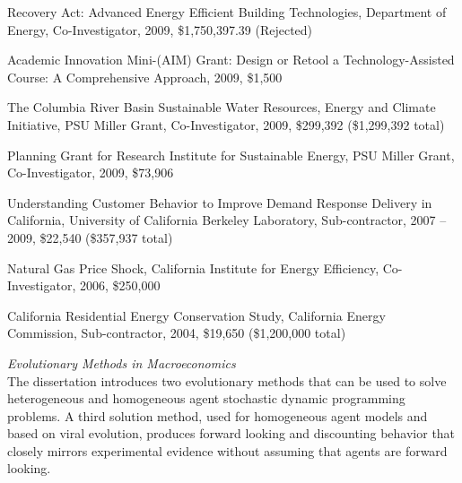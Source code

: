 \documentclass[Computer Science]{vita}
\begin{document}
\begin{vita}
\begin{Grants and Sponsored Research}
\item Recovery Act:  Advanced Energy Efficient Building Technologies, Department of Energy, Co-Investigator, 2009, \$1,750,397.39 (Rejected)
 
\item Academic Innovation Mini-(AIM) Grant: Design or Retool a Technology-Assisted Course: A Comprehensive Approach, 2009, \$1,500

\item The Columbia River Basin Sustainable Water Resources, Energy and Climate Initiative,  PSU Miller Grant, Co-Investigator, 2009, \$299,392 (\$1,299,392 total)

\item Planning Grant for Research Institute for Sustainable Energy, PSU Miller Grant,  Co-Investigator, 2009, \$73,906

  \item Understanding Customer Behavior to Improve Demand Response Delivery in California, University of California Berkeley Laboratory, Sub-contractor, 2007 -- 2009, \$22,540 (\$357,937 total)

\item Natural Gas Price Shock, California Institute for Energy
    Efficiency, Co-Investigator, 2006, \$250,000

\item California Residential Energy Conservation Study, California Energy Commission, Sub-contractor, 2004, \$19,650 (\$1,200,000 total)

  \end{Grants and Sponsored Research}

  \begin{Publications}

    \begin{Thesis}
    \item \emph{Evolutionary Methods in Macroeconomics} \\
      The dissertation introduces two evolutionary methods that can be
      used to solve heterogeneous and homogeneous agent stochastic
      dynamic programming problems. A third solution method, used for
      homogeneous agent models and based on viral evolution, produces
      forward looking and discounting behavior that closely mirrors
      experimental evidence without assuming that agents are forward
      looking.

    \end{Thesis}

    \begin{Papers in Refereed Journals}
    

\end{Papers in Refereed Journals}
\end{Publications}
\end{vita}
\end{document}
